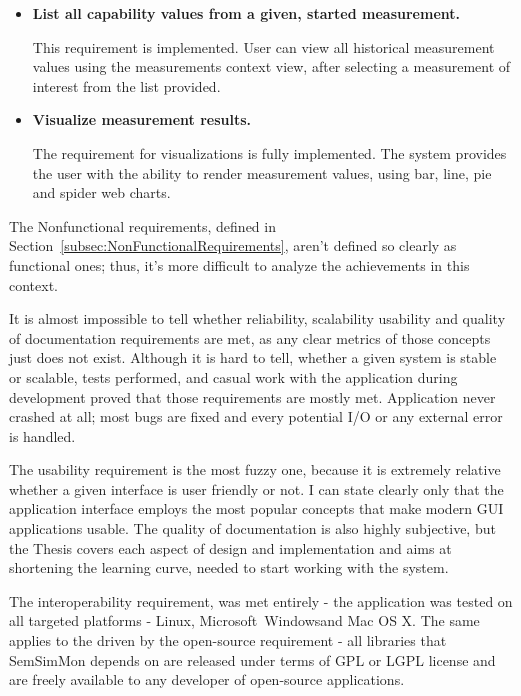 \begin{itemize}
\item {\bf List all capability values from a given, started measurement.}

This requirement is implemented. User can view all historical measurement values using the measurements context view, after selecting a measurement of interest from the list provided.

\item {\bf Visualize measurement results.}

The requirement for visualizations is fully implemented. The system provides the user with the ability to render measurement values, using bar, line, pie and spider web charts.

\end{itemize}

The Nonfunctional requirements, defined in Section~\ref{subsec:NonFunctionalRequirements}, aren\rq{}t defined so clearly as functional ones; thus, it\rq{}s more difficult to analyze the achievements in this context.

It is almost impossible to tell whether reliability, scalability usability and quality of documentation requirements are met, as any clear metrics of those concepts just does not exist. Although it is hard to tell, whether a given system is stable or scalable, tests performed, and casual work with the application during development proved that those requirements are mostly met. Application never crashed at all; most bugs are fixed and every potential I/O or any external error is handled.

The usability requirement is the most fuzzy one, because it is extremely relative whether a given interface is user friendly or not. I can state clearly only that the application interface employs the most popular concepts that make modern GUI applications usable. The quality of documentation is also highly subjective, but the Thesis covers each aspect of design and implementation and aims at shortening the learning curve, needed to start working with the system.

The interoperability requirement, was met entirely - the application was tested on all targeted platforms - Linux, Microsoft\textregistered~Windows\textregistered and Mac OS X\textregistered. The same applies to the driven by the open-source requirement - all libraries that SemSimMon depends on are released under terms of GPL or LGPL license and are freely available to any developer of open-source applications.
